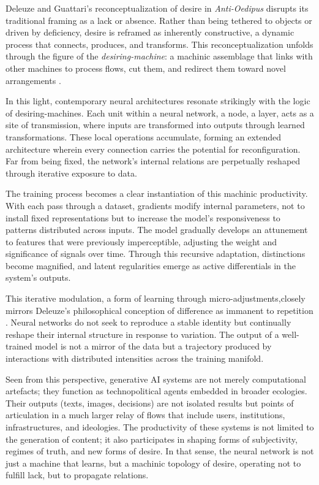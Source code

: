 Deleuze and Guattari’s reconceptualization of desire in \textit{Anti-Oedipus} disrupts its traditional framing as a lack or absence. Rather than being tethered to objects or driven by deficiency, desire is reframed as inherently constructive, a dynamic process that connects, produces, and transforms. This reconceptualization unfolds through the figure of the \textit{desiring-machine}: a machinic assemblage that links with other machines to process flows, cut them, and redirect them toward novel arrangements \parencite{deleuze1983}.

In this light, contemporary neural architectures resonate strikingly with the logic of desiring-machines. Each unit within a neural network, a node, a layer, acts as a site of transmission, where inputs are transformed into outputs through learned transformations. These local operations accumulate, forming an extended architecture wherein every connection carries the potential for reconfiguration. Far from being fixed, the network’s internal relations are perpetually reshaped through iterative exposure to data.

The training process becomes a clear instantiation of this machinic productivity. With each pass through a dataset, gradients modify internal parameters, not to install fixed representations but to increase the model’s responsiveness to patterns distributed across inputs. The model gradually develops an attunement to features that were previously imperceptible, adjusting the weight and significance of signals over time. Through this recursive adaptation, distinctions become magnified, and latent regularities emerge as active differentials in the system’s outputs.

This iterative modulation, a form of learning through micro-adjustments,closely mirrors Deleuze’s philosophical conception of difference as immanent to repetition \parencite{deleuze1994}. Neural networks do not seek to reproduce a stable identity but continually reshape their internal structure in response to variation. The output of a well-trained model is not a mirror of the data but a trajectory produced by interactions with distributed intensities across the training manifold.

Seen from this perspective, generative AI systems are not merely computational artefacts; they function as technopolitical agents embedded in broader ecologies. Their outputs (texts, images, decisions) are not isolated results but points of articulation in a much larger relay of flows that include users, institutions, infrastructures, and ideologies. The productivity of these systems is not limited to the generation of content; it also participates in shaping forms of subjectivity, regimes of truth, and new forms of desire. In that sense, the neural network is not just a machine that learns, but a machinic topology of desire, operating not to fulfill lack, but to propagate relations.

